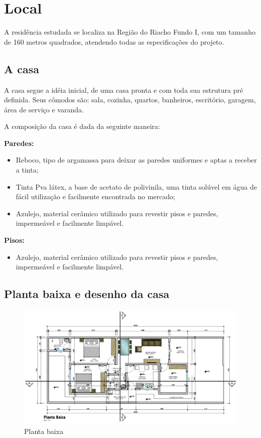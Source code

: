 \section{Local}
A residência estudada se localiza na Região do Riacho Fundo I, com um tamanho de 160 metros quadrados, atendendo todas as especificações do projeto.

\subsection{A casa}
\par A casa segue a idéia inicial, de uma casa pronta e com toda sua estrutura pré definida. Seus cômodos são: sala, cozinha, quartos, banheiros, escritório, garagem, área de serviço e varanda.
\par A composição da casa é dada da seguinte maneira:
\par \textbf{Paredes:}
    \begin{itemize}
        \item Reboco, tipo de argamassa para deixar as paredes uniformes e aptas a receber a tinta;
        \item Tinta Pva látex, a base de acetato de polivinila, uma tinta solúvel em água de fácil utilização e facilmente encontrada no mercado;
        \item Azulejo, material cerâmico utilizado para revestir pisos e paredes, impermeável e facilmente limpável.
    \end{itemize}
\par \textbf{Pisos:}
    \begin{itemize}
        \item Azulejo, material cerâmico utilizado para revestir pisos e paredes, impermeável e facilmente limpável.
    \end{itemize}
\subsection{Planta baixa e desenho da casa}

\FloatBarrier

\begin{figure}[!h]
\caption{Planta baixa}
\includegraphics[width=\textwidth]{figuras/planta}
\end{figure}

